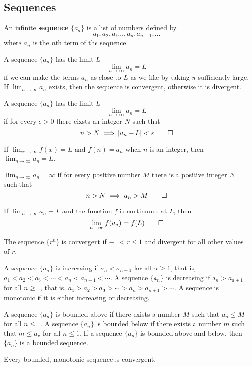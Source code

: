 \subsection{Sequences}
An infinite \textbf{sequence} \(\{a_n\}\) is a list of numbers defined by
\[a_1,a_2,a_3\dots,a_n,a_{n+1},\dots\]
where \(a_n\) is the \(n\)th term of the sequence.
\begin{definition}
    A sequence \(\{a_n\}\) has the limit \(L\)
    \[\lim_{n\to\infty}a_n=L\]
    if we can make the terms \(a_n\) as close to \(L\) as we like by taking
    \(n\) sufficiently large.
    If \(\lim_{n\to\infty}a_n\) exists, then the sequence is convergent,
    otherwise it is divergent.
\end{definition}
\begin{definition}
    A sequence \(\{a_n\}\) has the limit \(L\)
    \[\lim_{n\to\infty}a_n=L\]
    if for every \(\epsilon>0\) there eixsts an integer \(N\) such that
    \[n>N\implies |a_n-L|<\epsilon\qedhere\]
\end{definition}
\begin{theorem}
    If \(\lim_{x\to\infty}f(x)=L\) and \(f(n)=a_n\) when \(n\) is an integer,
    then \(\lim_{n\to\infty}a_n=L\).
\end{theorem}
\begin{definition}
    \(\lim_{n\to\infty}a_n=\infty\) if for every positive number \(M\) there
    is a positive integer \(N\) such that
    \[n>N\implies a_n>M\qedhere\]
\end{definition}
\begin{theorem}
    If \(\lim_{n\to\infty}a_n=L\) and the function \(f\) is continuous at
    \(L\), then
    \[\lim_{n\to\infty}f(a_n)=f(L)\qedhere\]
\end{theorem}
The sequence \(\{r^n\}\) is convergent if \(-1<r\leq 1\) and divergent for all
other values of \(r\).
\begin{definition}
    A sequence \(\{a_n\}\) is increasing if \(a_n<a_{n+1}\) for all
    \(n\geq 1\), that is, \(a_1<a_2<a_3<\cdots<a_n<a_{n+1}<\cdots\).
    A sequence \(\{a_n\}\) is decreasing if \(a_n>a_{n+1}\) for all
    \(n\geq 1\), that is, \(a_1>a_2>a_3>\cdots>a_n>a_{n+1}>\cdots\).
    A sequence is monotonic if it is either increasing or decreasing.
\end{definition}
\begin{definition}
    A sequence \(\{a_n\}\) is bounded above if there exists a number \(M\)
    such that \(a_n\leq M\) for all \(n\leq 1\).
    A sequence \(\{a_n\}\) is bounded below if there exists a number \(m\)
    such that \(m\leq a_n\) for all \(n\leq 1\).
    If a sequence \(\{a_n\}\) is bounded above and below, then \(\{a_n\}\) is
    a bounded sequence.
\end{definition}
\begin{theorem}
    Every bounded, monotonic sequence is convergent.
\end{theorem}